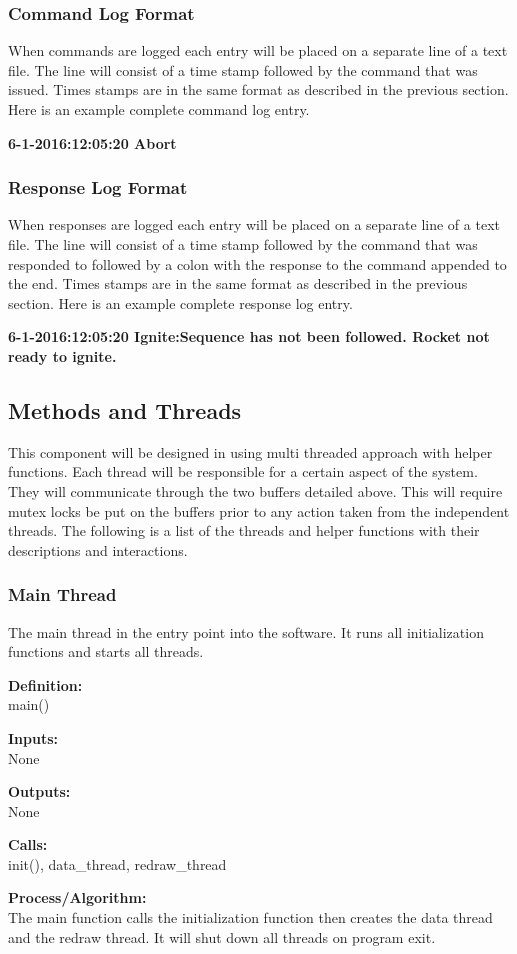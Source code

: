 \documentclass[10pt,draftclsnofoot,onecolumn,retainorgcmds]{IEEEtran}
\begin{document}
\subsubsection{Command Log Format}
When commands are logged each entry will be placed on a separate line of a text file. The line will consist of a time stamp followed by the command that was issued. Times stamps are in the same format as described in the previous section. Here is an example complete command log entry.\par
{\bf  6-1-2016:12:05:20 Abort}\par

\subsubsection{Response Log Format}
When responses are logged each entry will be placed on a separate line of a text file. The line will consist of a time stamp followed by the command that was responded to followed by a colon with the response to the command appended to the end. Times stamps are in the same format as described in the previous section. Here is an example complete response log entry.\par
{\bf  6-1-2016:12:05:20 Ignite:Sequence has not been followed. Rocket not ready to ignite.}\par

\subsection{Methods and Threads}
This component will be designed in using multi threaded approach with helper functions. Each thread will be responsible for a certain aspect of the system. They will communicate through the two buffers detailed above. This will require mutex locks be put on the buffers prior to any action taken from the independent threads. The following is a list of the threads and helper functions with their descriptions and interactions.
\subsubsection{Main Thread}
The main thread in the entry point into the software. It runs all initialization functions and starts all threads. \par
{\bf Definition:} \\ 
main() \par
{\bf Inputs:} \\  None \par
{\bf Outputs:} \\ None \par
{\bf Calls:} \\ init(), data\_thread, redraw\_thread \par
{\bf Process/Algorithm:} \\
The main function calls the initialization function then creates the data thread and the redraw thread. It will shut down all threads on program exit. \par
\end{document}
